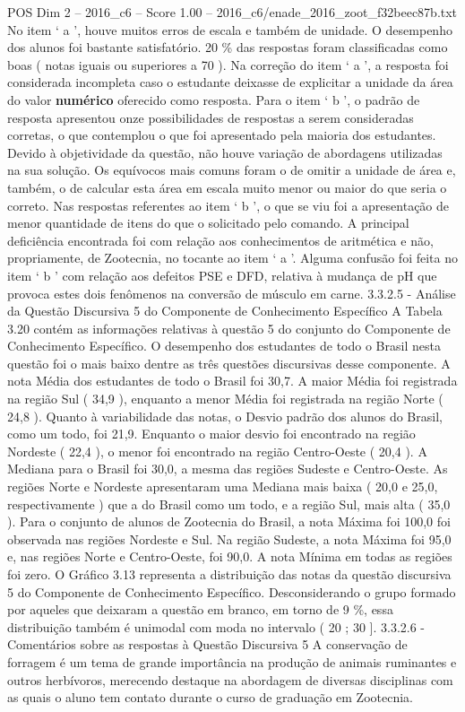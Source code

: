 \begin{textsample}{POS Dim 2 – 2016\_c6 – Score 1.00 – 2016\_c6/enade\_2016\_zoot\_f32beec87b.txt}
No item ‘ a ’, houve muitos erros de escala e também de unidade.
O desempenho dos alunos foi bastante satisfatório. 20 \% das respostas foram classificadas como boas ( notas iguais ou superiores a 70 ).
Na correção do item ‘ a ’, a resposta foi considerada incompleta caso o estudante deixasse de explicitar a unidade da área do valor \textbf{numérico} oferecido como resposta.
Para o item ‘ b ’, o padrão de resposta apresentou onze possibilidades de respostas a serem consideradas corretas, o que contemplou o que foi apresentado pela maioria dos estudantes.
Devido à objetividade da questão, não houve variação de abordagens utilizadas na sua solução.
Os equívocos mais comuns foram o de omitir a unidade de área e, também, o de calcular esta área em escala muito menor ou maior do que seria o correto.
Nas respostas referentes ao item ‘ b ’, o que se viu foi a apresentação de menor quantidade de itens do que o solicitado pelo comando.
A principal deficiência encontrada foi com relação aos conhecimentos de aritmética e não, propriamente, de Zootecnia, no tocante ao item ‘ a ’.
Alguma confusão foi feita no item ‘ b ’ com relação aos defeitos PSE e DFD, relativa à mudança de pH que provoca estes dois fenômenos na conversão de músculo em carne. 3.3.2.5 - Análise da Questão Discursiva 5 do Componente de Conhecimento Específico A Tabela 3.20 contém as informações relativas à questão 5 do conjunto do Componente de Conhecimento Específico.
O desempenho dos estudantes de todo o Brasil nesta questão foi o mais baixo dentre as três questões discursivas desse componente.
A nota Média dos estudantes de todo o Brasil foi 30,7.
A maior Média foi registrada na região Sul ( 34,9 ), enquanto a menor Média foi registrada na região Norte ( 24,8 ).
Quanto à variabilidade das notas, o Desvio padrão dos alunos do Brasil, como um todo, foi 21,9.
Enquanto o maior desvio foi encontrado na região Nordeste ( 22,4 ), o menor foi encontrado na região Centro-Oeste ( 20,4 ).
A Mediana para o Brasil foi 30,0, a mesma das regiões Sudeste e Centro-Oeste.
As regiões Norte e Nordeste apresentaram uma Mediana mais baixa ( 20,0 e 25,0, respectivamente ) que a do Brasil como um todo, e a região Sul, mais alta ( 35,0 ).
Para o conjunto de alunos de Zootecnia do Brasil, a nota Máxima foi 100,0 foi observada nas regiões Nordeste e Sul.
Na região Sudeste, a nota Máxima foi 95,0 e, nas regiões Norte e Centro-Oeste, foi 90,0.
A nota Mínima em todas as regiões foi zero.
O Gráfico 3.13 representa a distribuição das notas da questão discursiva 5 do Componente de Conhecimento Específico.
Desconsiderando o grupo formado por aqueles que deixaram a questão em branco, em torno de 9 \%, essa distribuição também é unimodal com moda no intervalo ( 20 ; 30 ]. 3.3.2.6 - Comentários sobre as respostas à Questão Discursiva 5 A conservação de forragem é um tema de grande importância na produção de animais ruminantes e outros herbívoros, merecendo destaque na abordagem de diversas disciplinas com as quais o aluno tem contato durante o curso de graduação em Zootecnia.

\end{textsample}
